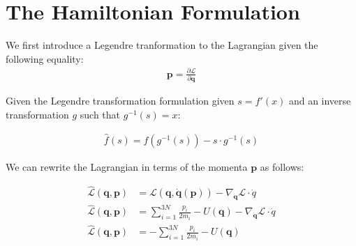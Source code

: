 \documentclass[draft]{agujournal2019}
\begin{document}
\section{The Hamiltonian Formulation}
We first introduce a Legendre tranformation to the Lagrangian given the following equality:
\begin{align}
    \mathbf{p} = \frac{\partial \mathcal{L}}{\partial \mathbf{q}}
\end{align}

Given the Legendre transformation formulation given $s = f'(x)$ and an inverse transformation $g$ such that $g^{-1}(s) = x$:

\begin{align}
    \hat{f}(s) = f(g^{-1}(s)) - s \cdot g^{-1}(s)
\end{align}

We can rewrite the Lagrangian in terms of the momenta $\mathbf{p}$ as follows:

\begin{align}
    \hat{\mathcal{L}}(\mathbf{q}, \mathbf{p}) &= \mathcal{L}(\mathbf{q}, \dot{\mathbf{q}}(\mathbf{p})) - \nabla_{\dot{\mathbf{q}}} \mathcal{L} \cdot \dot{q} \\
    \hat{\mathcal{L}}(\mathbf{q}, \mathbf{p}) &= \sum_{i = 1}^{3N} \frac{p_i}{2m_i} - U(\mathbf{q}) - \nabla_{\dot{\mathbf{q}}} \mathcal{L} \cdot \dot{q} \\
    \hat{\mathcal{L}}(\mathbf{q}, \mathbf{p}) &= - \sum_{i = 1}^{3N} \frac{p_i}{2m_i} - U(\mathbf{q})
\end{align}
\end{document}

